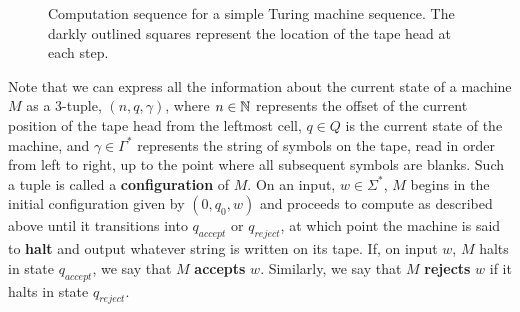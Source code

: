 \documentclass{article}
\begin{document}
\begin{figure}
  \caption{Computation sequence for a simple Turing machine sequence.
    The darkly outlined squares represent the location of the tape
    head at each step.}
  \label{turing-example}
\end{figure}

Note that we can express all the information about the current state
of a machine $M$ as a 3-tuple, $(n, q, \gamma)$, where $n \in
\mathbb{N}$ represents the offset of the current position of the tape
head from the leftmost cell, $q \in Q$ is the current state of the
machine, and $\gamma \in \Gamma^*$ represents the string of symbols
on the tape, read in order from left to right, up to the point where
all subsequent symbols are blanks.  Such a tuple is called a
\textbf{configuration} of $M$. On an input, $w \in \Sigma^*$, $M$
begins in the initial configuration given by $(0, q_0, w)$ and
proceeds to compute as described above until it transitions into
$q_{accept}$ or $q_{reject}$, at which point the machine is said to
\textbf{halt} and output whatever string is written on its tape.
If, on input $w$, $M$ halts in state $q_{accept}$, we say that $M$
\textbf{accepts} $w$.  Similarly, we say that $M$ \textbf{rejects}
$w$ if it halts in state $q_{reject}.$ \\
\end{document}
